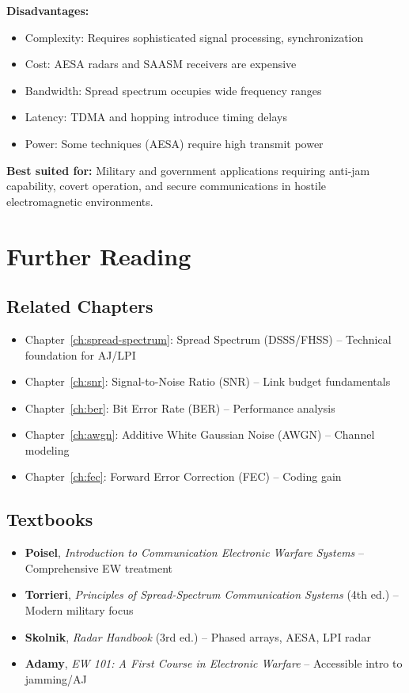 \textbf{Disadvantages:}
\begin{itemize}
\item Complexity: Requires sophisticated signal processing, synchronization
\item Cost: AESA radars and SAASM receivers are expensive
\item Bandwidth: Spread spectrum occupies wide frequency ranges
\item Latency: TDMA and hopping introduce timing delays
\item Power: Some techniques (AESA) require high transmit power
\end{itemize}

\textbf{Best suited for:} Military and government applications requiring anti-jam capability, covert operation, and secure communications in hostile electromagnetic environments.

\section{Further Reading}

\subsection{Related Chapters}

\begin{itemize}
\item Chapter~\ref{ch:spread-spectrum}: Spread Spectrum (DSSS/FHSS) -- Technical foundation for AJ/LPI
\item Chapter~\ref{ch:snr}: Signal-to-Noise Ratio (SNR) -- Link budget fundamentals
\item Chapter~\ref{ch:ber}: Bit Error Rate (BER) -- Performance analysis
\item Chapter~\ref{ch:awgn}: Additive White Gaussian Noise (AWGN) -- Channel modeling
\item Chapter~\ref{ch:fec}: Forward Error Correction (FEC) -- Coding gain
\end{itemize}

\subsection{Textbooks}

\begin{itemize}
\item \textbf{Poisel}, \emph{Introduction to Communication Electronic Warfare Systems} -- Comprehensive EW treatment
\item \textbf{Torrieri}, \emph{Principles of Spread-Spectrum Communication Systems} (4th ed.) -- Modern military focus
\item \textbf{Skolnik}, \emph{Radar Handbook} (3rd ed.) -- Phased arrays, AESA, LPI radar
\item \textbf{Adamy}, \emph{EW 101: A First Course in Electronic Warfare} -- Accessible intro to jamming/AJ
\end{itemize}

